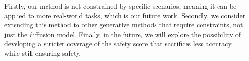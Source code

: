 Firstly, our method is not constrained by specific scenarios, meaning it can be applied to more real-world tasks, which is our future work. Secondly, we consider extending this method to other generative methods that require constraints, not just the diffusion model. Finally, in the future, we will explore the possibility of developing a stricter coverage of the safety score that sacrifices less accuracy while still ensuring safety.

